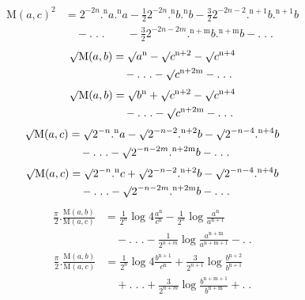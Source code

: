 \[
\begin{aligned}\mathrm{M}(a,c)^2&=2^{-2n}.{}^{\mathrm{n}}a.{}^{\mathrm{n}}a-\frac12 2^{-2n}.{}^{\mathrm{n}}b.{}^{\mathrm{n}}b-\frac32 2^{-2n-2}.{}^{\mathrm{n}+1}b.{}^{\mathrm{n}+1}b\\&\quad-.\;.\;.\qquad-\frac32 2^{-2n-2m}.{}^{\mathrm{n}+\mathrm{m}}b.{}^{\mathrm{n}+\mathrm{m}}b-.\;.\;.\end{aligned}
\]
\[
\begin{aligned}\surd\mathrm{M}(a,b)&=\surd a^{\mathrm{n}}-\surd c^{\mathrm{n}+2}-\surd c^{\mathrm{n}+4}\\&\quad-.\;.\;.-\surd c^{\mathrm{n}+2\mathrm{m}}-.\;.\;.\end{aligned}
\]
\[
\begin{aligned}\surd\mathrm{M}(a,b)&=\surd b^{\mathrm{n}}+\surd c^{\mathrm{n}+2}-\surd c^{\mathrm{n}+4}\\&\quad-.\;.\;.-\surd c^{\mathrm{n}+2\mathrm{m}}-.\;.\;.\end{aligned}
\]
\[
\begin{aligned}\surd\mathrm{M}(a,c)&=\surd2^{-n}.{}^{\mathrm{n}}a-\surd2^{-n-2}.{}^{\mathrm{n}+2}b-\surd2^{-n-4}.{}^{\mathrm{n}+4}b\\&\quad-.\;.\;.-\surd2^{-n-2m}.{}^{\mathrm{n}+2\mathrm{m}}b-.\;.\;.\end{aligned}
\]
\[
\begin{aligned}\surd\mathrm{M}(a,c)&=\surd2^{-n}.{}^{\mathrm{n}}c+\surd2^{-n-2}.{}^{\mathrm{n}+2}b-\surd2^{-n-4}.{}^{\mathrm{n}+4}b\\&\quad-.\;.\;.-\surd2^{-n-2m}.{}^{\mathrm{n}+2\mathrm{m}}b-.\;.\;.\end{aligned}
\]
\[
\begin{aligned}\displaystyle\frac\pi2.\frac{\mathrm{M}(a,b)}{\mathrm{M}(a,c)}&\displaystyle=\frac1{2^n}\log4\frac{a^{\mathrm{n}}}{c^{\mathrm{n}}}-\frac1{2^n}\log\frac{a^{\mathrm{n}}}{a^{\mathrm{n}+1}}\\&\quad-.\;.\;.-\frac1{2^{n+m}}\log\frac{a^{\mathrm{n}+\mathrm{m}}}{a^{\mathrm{n}+\mathrm{m}+1}}-.\;.\end{aligned}
\]
\[
\begin{aligned}\displaystyle\frac\pi2.\frac{\mathrm{M}(a,b)}{\mathrm{M}(a,c)}&\displaystyle=\frac1{2^n}\log4\frac{b^{\mathrm{n}+1}}{c^{\mathrm{n}}}+\frac3{2^{n+1}}\log\frac{b^{\mathrm{n}+2}}{b^{\mathrm{n}+1}}\\&\quad+.\;.\;.+\frac3{2^{n+m}}\log\frac{b^{\mathrm{n}+\mathrm{m}+1}}{b^{\mathrm{n}+\mathrm{m}}}+.\;.\end{aligned}
\]

